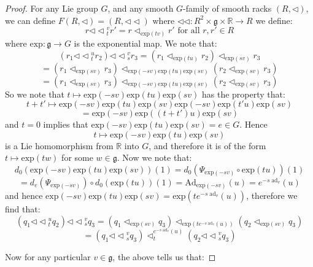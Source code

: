 \documentclass[12pt]{amsart}
\theoremstyle{plain}
\theoremstyle{definition}
\begin{document}
\begin{proof}
 For any Lie group $G$, and any smooth $G$-family of smooth racks $(R,\triangleleft)$, we can define $F(R,\triangleleft) = (R,\triangleleft\!\!\triangleleft)$ where $\triangleleft\!\!\triangleleft: R^2\times \mathfrak{g}\times\mathbb{R} \to R$ we define:
$$ r {\triangleleft\!\!\triangleleft}_t^v r' =r \triangleleft_{\text{exp}(tv)} r' \text{ for all }r,r' \in R$$
 where $\text{exp}:\mathfrak{g} \to G$ is the exponential map. We note that:
 $$ (r_1 {\triangleleft\!\!\triangleleft}_t^u r_2 ){\triangleleft\!\!\triangleleft}_s^v r_3  = (r_1 \triangleleft_{\text{exp}(tu)} r_2) \triangleleft_{\text{exp}(sv)} r_3$$
$$= (r_1\triangleleft_{\text{exp}(sv)} r_3) \triangleleft_{\text{exp}(-sv)\text{exp}(tu)\text{exp}(sv)} (r_2\triangleleft_{\text{exp}(sv)} r_3) $$
$$= (r_1\triangleleft_{\text{exp}(sv)} r_3) \triangleleft_{\text{exp}(-sv)\text{exp}(tu)\text{exp}(sv)} (r_2\triangleleft_{\text{exp}(sv)} r_3) $$
So we note that $ t \mapsto  \text{exp}(-sv)\text{exp}(tu)\text{exp}(sv)$ has the property that:
$$ t+t' \mapsto \text{exp}(-sv)\text{exp}(tu)\text{exp}(sv)\text{exp}(-sv)\text{exp}(t'u)\text{exp}(sv) $$
$$ = \text{exp}(-sv)\text{exp}((t+t')u)\text{exp}(sv) $$
and $t=0$ implies that $\text{exp}(-sv)\text{exp}(tu)\text{exp}(sv)  =e \in G$. Hence $$t \mapsto  \text{exp}(-sv)\text{exp}(tu)\text{exp}(sv)$$ is a Lie homomorphism from $\mathbb{R}$ into $G$, and therefore it is of the form $t \mapsto \text{exp}(tw)$ for some $w \in \mathfrak{g}$. Now we note that:
 $$ d_0 (\text{exp}(-sv)\text{exp}(tu)\text{exp}(sv))(1) = d_0 (\Psi_{\text{exp}(-sv)} \circ \text{exp}(tu))(1) $$
$$= d_e (\Psi_{\text{exp}(-sv)}) \circ d_0(\text{exp}(tu))(1) = \text{Ad}_{\text{exp}(-sv)}(u) = e^{-s\; \text{ad}_v}(u) $$
and hence $\text{exp}(-sv)\text{exp}(tu)\text{exp}(sv) = \text{exp}(t e^{-s \; \text{ad}_v}(u) ) $, therefore we find that:
$$ (q_1 {\triangleleft\!\!\triangleleft}_t^u q_2 ){\triangleleft\!\!\triangleleft}_s^v q_3 =  (q_1\triangleleft_{\text{exp}(sv)} q_3) \triangleleft_{\text{exp}(t e^{-s \; \text{ad}_v}(u) ) } (q_2\triangleleft_{\text{exp}(sv)} q_3)  $$
$$=  (q_1{\triangleleft\!\!\triangleleft}^v_s q_3) \triangleleft_{t   }^{e^{-s \; \text{ad}_v}(u)} (q_2 {\triangleleft\!\!\triangleleft}^v_s q_3 )  $$

Now for any particular $v \in \mathfrak{g}$, the above tells us that:


\end{proof}
\end{document}
